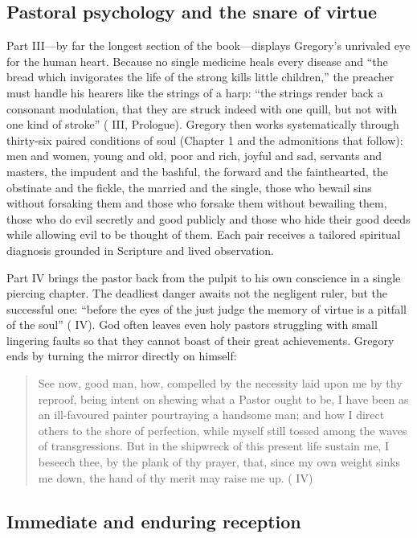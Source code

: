 \subsection{Pastoral psychology and the snare of virtue}

Part III---by far the longest section of the book---displays Gregory's
unrivaled eye for the human heart. Because no single medicine heals every
disease and ``the bread which invigorates the life of the strong kills little
children,'' the preacher must handle his hearers like the strings of a harp:
``the strings render back a consonant modulation, that they are struck indeed
with one quill, but not with one kind of stroke'' (
III, Prologue). Gregory then works systematically through thirty-six paired
conditions of soul (Chapter 1 and the admonitions that follow): men and women,
young and old, poor and rich, joyful and sad, servants and masters, the
impudent and the bashful, the forward and the fainthearted, the obstinate and
the fickle, the married and the single, those who bewail sins without forsaking
them and those who forsake them without bewailing them, those who do evil
secretly and good publicly and those who hide their good deeds while allowing
evil to be thought of them. Each pair receives a tailored spiritual diagnosis
grounded in Scripture and lived observation.

Part IV brings the pastor back from the pulpit to his own conscience in a
single piercing chapter. The deadliest danger awaits not the negligent ruler,
but the successful one: ``before the eyes of the just judge the memory of
virtue is a pitfall of the soul'' ( IV). God often
leaves even holy pastors struggling with small lingering faults so that they
cannot boast of their great achievements. Gregory ends by turning the mirror
directly on himself:

\begin{quote}
See now, good man, how, compelled by the necessity laid upon me by thy reproof,
being intent on shewing what a Pastor ought to be, I have been as an
ill-favoured painter pourtraying a handsome man; and how I direct others to the
shore of perfection, while myself still tossed among the waves of
transgressions. But in the shipwreck of this present life sustain me, I beseech
thee, by the plank of thy prayer, that, since my own weight sinks me down, the
hand of thy merit may raise me up. ( IV)
\end{quote}

\subsection{Immediate and enduring reception}

